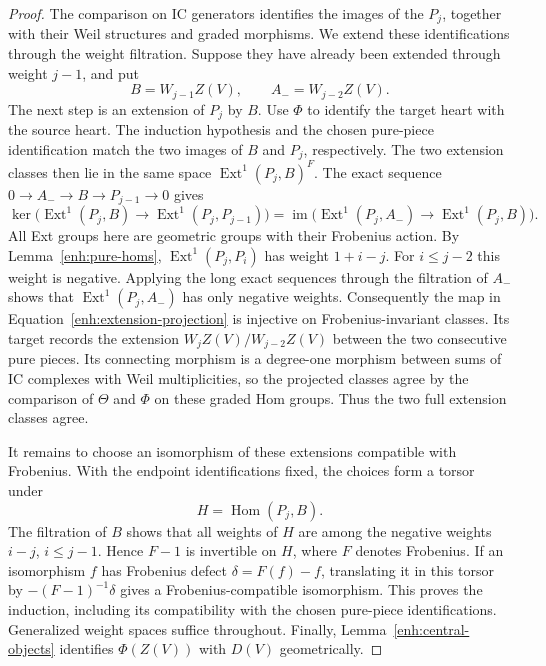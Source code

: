 \documentclass[11pt]{article}
\numberwithin{equation}{section}
\theoremstyle{definition}
\theoremstyle{remark}
\newcommand{\Hom}{\operatorname{Hom}}
\newcommand{\Ext}{\operatorname{Ext}}
\begin{document}
\begin{proof}
The comparison on IC generators identifies the images of the $P_j$,
together with their Weil structures and graded morphisms.  We extend
these identifications through the weight filtration.  Suppose they
have already been extended through weight $j-1$, and put
\[
 B=W_{j-1}Z(V),\qquad A_-=W_{j-2}Z(V).
\]
The next step is an extension of $P_j$ by $B$.  Use $\Phi$ to identify
the target heart with the source heart.  The induction hypothesis and
the chosen pure-piece identification match the two images of $B$ and
$P_j$, respectively.  The two extension classes then lie in the same
space $\Ext^1(P_j,B)^F$.  The exact sequence
$0\to A_-\to B\to P_{j-1}\to0$ gives
\begin{equation}\label{enh:extension-projection}
 \ker\bigl(\Ext^1(P_j,B)\longrightarrow
                  \Ext^1(P_j,P_{j-1})\bigr)
 =\operatorname{im}\bigl(\Ext^1(P_j,A_-)
                  \longrightarrow\Ext^1(P_j,B)\bigr).
\end{equation}
All Ext groups here are geometric groups with their Frobenius action.
By Lemma~\ref{enh:pure-homs},
$\Ext^1(P_j,P_i)$ has weight $1+i-j$.  For $i\leq j-2$ this
weight is negative.  Applying the long exact sequences through the
filtration of $A_-$ shows that $\Ext^1(P_j,A_-)$ has only negative
weights.  Consequently the map in
Equation~\eqref{enh:extension-projection} is injective on
Frobenius-invariant classes.  Its target records the extension
$W_jZ(V)/W_{j-2}Z(V)$ between the two consecutive pure pieces.
Its connecting morphism is a degree-one morphism between sums of IC
complexes with Weil multiplicities, so the projected classes agree
by the comparison of $\Theta$ and $\Phi$ on these graded Hom groups.
Thus the two full extension classes agree.

It remains to choose an isomorphism of these extensions compatible
with Frobenius.  With the endpoint identifications fixed, the choices
form a torsor under
\[
 H=\Hom(P_j,B).
\]
The filtration of $B$ shows that all weights of $H$ are among the
negative weights $i-j$, $i\leq j-1$.  Hence $F-1$ is invertible
on $H$, where $F$ denotes Frobenius.  If an isomorphism $f$ has
Frobenius defect $\delta=F(f)-f$, translating it in this torsor by
$-(F-1)^{-1}\delta$ gives a Frobenius-compatible isomorphism.
This proves the induction, including its compatibility with the
chosen pure-piece identifications.  Generalized weight spaces suffice
throughout.  Finally, Lemma~\ref{enh:central-objects} identifies
$\Phi(Z(V))$ with $D(V)$ geometrically.
\end{proof}
\end{document}

